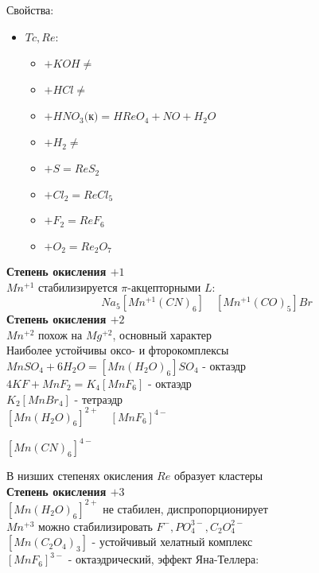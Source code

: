 Свойства:
\begin{itemize}
	\item $Tc, Re$:
	\begin{itemize}
		\item $+ KOH \not = $
		\item $+ HCl \not = $
		\item $+ HNO_3\text{(к)} = HReO_4 + NO + H_2O$
		\item $+ H_2 \not = $
		\item $+ S  = ReS_2$
		\item $+ Cl_2 = ReCl_5$
		\item $+ F_2 = ReF_6$
		\item $+ O_2 =  Re_2O_7$		
	\end{itemize}
\end{itemize}
\textbf{Степень окисления $+1$} \\
$Mn^{+1}$ стабилизируется $\pi$-акцепторными $L$:
\[
Na_5\left[Mn^{+1}(CN)_6\right] \quad \left[Mn^{+1}(CO)_5\right]Br
\]
\textbf{Степень окисления $+2$} \\
$Mn^{+2}$ похож на $Mg^{+2}$, основный характер \\
Наиболее устойчивы оксо- и фторокомплексы 
$MnSO_4 + 6 H_2O = \left[Mn(H_2O)_6 \right]SO_4$ - октаэдр \\
$4KF + MnF_2 = K_4\left[MnF_6 \right]$ - октаэдр \\
$K_2\left[MnBr_4 \right]$ - тетраэдр \\
$\left[Mn(H_2O)_6 \right]^{2+} \quad \left[MnF_6 \right]^{4-} $
\begin{figure} [H]
	\centering {\texttt{[image: zz3]}}
\end{figure}
$ \left[Mn(CN)_6 \right]^{4-} $
\begin{figure} [H]
	\centering {\texttt{[image: zz2]}}
\end{figure}
В низших степенях окисления $Re$ образует кластеры \\
\textbf{Степень окисления $+3$} \\
$\left[Mn(H_2O)_6 \right]^{2+}$ не стабилен, диспропорционирует \\
$Mn^{+3}$ можно стабилизировать $F^-, PO_4^{3-}, C_2O_4^{2-}$ \\
$\left[Mn(C_2O_4)_3 \right]$ - устойчивый хелатный комплекс \\
$\left[MnF_6 \right]^{3-}$ - октаэдрический, эффект Яна-Теллера: 
\begin{figure} [H]
	\centering {\texttt{[image: zz4]}}
\end{figure} 

